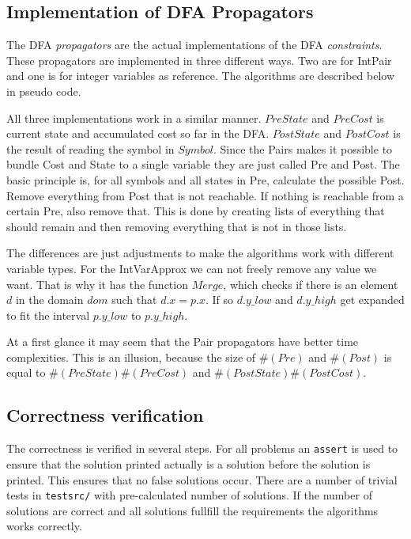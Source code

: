 \documentclass[a4paper,11pt]{article}
\begin{document}
\subsection{Implementation of DFA Propagators}
The DFA \textit{propagators} are the actual implementations of the DFA \textit{constraints}. These propagators are implemented in three different ways. Two are for IntPair and one is for integer variables as reference. The algorithms are described below in pseudo code.

All three implementations work in a similar manner. $PreState$ and $PreCost$ is current state and accumulated cost so far in the DFA. $PostState$ and $PostCost$ is the result of reading the symbol in $Symbol$. Since the Pairs makes it possible to bundle Cost and State to a single variable they are just called Pre and Post. The basic principle is, for all symbols and all states in Pre, calculate the possible Post. Remove everything from Post that is not reachable. If nothing is reachable from a certain Pre, also remove that. This is done by creating lists of everything that should remain and then removing everything that is not in those lists.



The differences are just adjustments to make the algorithms work with different variable types. For the IntVarApprox we can not freely remove any value we want. That is why it has the function $Merge$, which checks if there is an element $d$ in the domain $dom$ such that $d.x=p.x$. If so $d.y\_low$ and $d.y\_high$ get expanded to fit the interval $p.y\_low$ to $p.y\_high$.

At a first glance it may seem that the Pair propagators have better time complexities. This is an illusion, because the size of $\#(Pre)$ and $\#(Post)$ is equal to $\#(PreState)\#(PreCost)$ and $\#(PostState)\#(PostCost)$.

\subsection{Correctness verification}
The correctness is verified in several steps. For all problems an \texttt{assert} is used to ensure that the solution printed actually is a solution before the solution is printed. This ensures that no false solutions occur. There are a number of trivial tests in \texttt{testsrc/} with pre-calculated number of solutions. If the number of solutions are correct and all solutions fullfill the requirements the algorithms works correctly.
\end{document}
